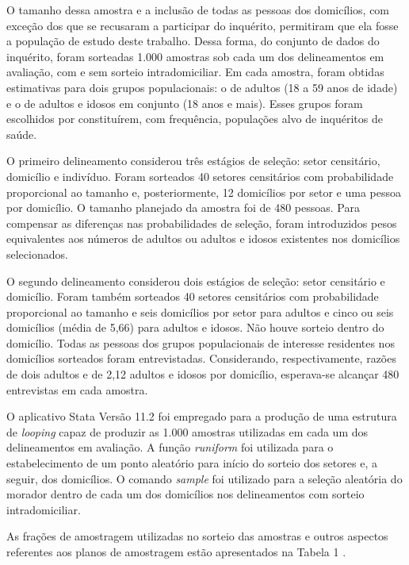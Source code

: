 \documentclass{article}
\begin{document}

O tamanho dessa amostra e a inclusão de todas as pessoas dos domicílios, com exceção dos que se recusaram a participar do inquérito, permitiram que ela fosse a população de estudo deste trabalho. Dessa forma, do conjunto de dados do inquérito, foram sorteadas 1.000 amostras sob cada um dos delineamentos em avaliação, com e sem sorteio intradomiciliar. Em cada amostra, foram obtidas estimativas para dois grupos populacionais: o de adultos (18 a 59 anos de idade) e o de adultos e idosos em conjunto (18 anos e mais). Esses grupos foram escolhidos por constituírem, com frequência, populações alvo de inquéritos de saúde.

O primeiro delineamento considerou três estágios de seleção: setor censitário, domicílio e indivíduo. Foram sorteados 40 setores censitários com probabilidade proporcional ao tamanho e, posteriormente, 12 domicílios por setor e uma pessoa por domicílio. O tamanho planejado da amostra foi de 480 pessoas. Para compensar as diferenças nas probabilidades de seleção, foram introduzidos pesos equivalentes aos números de adultos ou adultos e idosos existentes nos domicílios selecionados.

O segundo delineamento considerou dois estágios de seleção: setor censitário e domicílio. Foram também sorteados 40 setores censitários com probabilidade proporcional ao tamanho e seis domicílios por setor para adultos e cinco ou seis domicílios (média de 5,66) para adultos e idosos. Não houve sorteio dentro do domicílio. Todas as pessoas dos grupos populacionais de interesse residentes nos domicílios sorteados foram entrevistadas. Considerando, respectivamente, razões de dois adultos e de 2,12 adultos e idosos por domicílio, esperava-se alcançar 480 entrevistas em cada amostra.

O aplicativo Stata Versão 11.2 foi empregado para a produção de uma estrutura de %
\textit{looping}
 capaz de produzir as 1.000 amostras utilizadas em cada um dos delineamentos em avaliação. A função %
\textit{runiform}
 foi utilizada para o estabelecimento de um ponto aleatório para início do sorteio dos setores e, a seguir, dos domicílios. O comando %
\textit{sample}
 foi utilizado para a seleção aleatória do morador dentro de cada um dos domicílios nos delineamentos com sorteio intradomiciliar.

As frações de amostragem utilizadas no sorteio das amostras e outros aspectos referentes aos planos de amostragem estão apresentados na %
Tabela 1%
.
\end{document}
